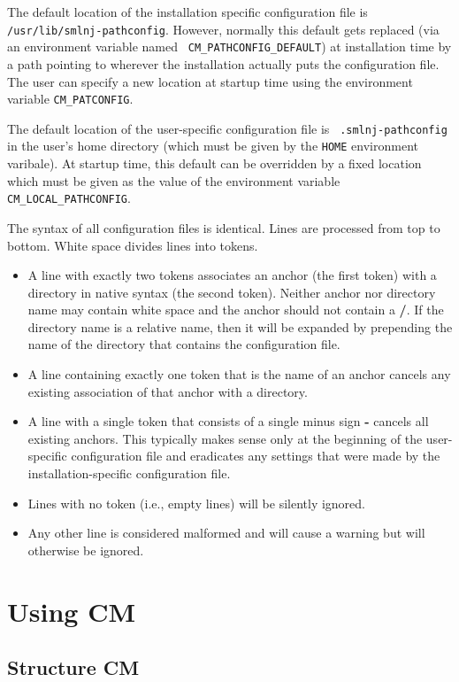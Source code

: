 \documentclass{article}
\begin{document}
The default location of the installation specific configuration file
is {\tt /usr/lib/smlnj-pathconfig}.  However, normally this default
gets replaced (via an environment variable named {\tt
CM\_PATHCONFIG\_DEFAULT}) at installation time by a path pointing to
wherever the installation actually puts the configuration file.
The user can specify a new location at startup time using the
environment variable {\tt CM\_PATCONFIG}.

The default location of the user-specific configuration file is {\tt
.smlnj-pathconfig} in the user's home directory (which must be given
by the {\tt HOME} environment varibale).  At startup time, this
default can be overridden by a fixed location which must be given as
the value of the environment variable {\tt CM\_LOCAL\_PATHCONFIG}.

The syntax of all configuration files is identical.  Lines are
processed from top to bottom. White space divides lines into tokens.
\begin{itemize}
\item A line with exactly two tokens associates an anchor (the first
token) with a directory in native syntax (the second token).  Neither
anchor nor directory name may contain white space and the anchor
should not contain a {\bf /}.  If the directory name is a relative
name, then it will be expanded by prepending the name of the directory
that contains the configuration file.
\item A line containing exactly one token that is the name of an
anchor cancels any existing association of that anchor with a
directory.
\item A line with a single token that consists of a single minus sign
{\bf -} cancels all existing anchors.  This typically makes sense only
at the beginning of the user-specific configuration file and
eradicates any settings that were made by the installation-specific
configuration file.
\item Lines with no token (i.e., empty lines) will be silently ignored.
\item Any other line is considered malformed and will cause a warning
but will otherwise be ignored.
\end{itemize}

\section{Using CM}

\subsection{Structure CM}
\label{sec:api}
\end{document}
